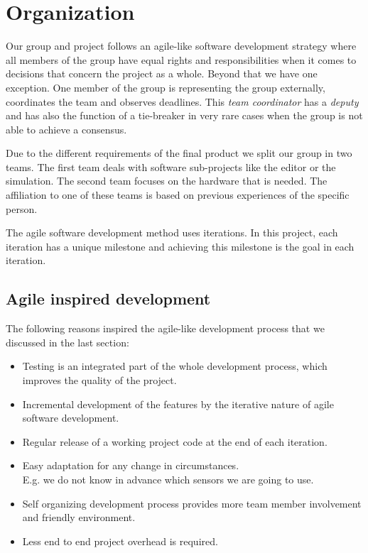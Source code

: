 \chapter{Organization}
Our group and project follows an agile-like software development strategy where all members of the group have equal rights and
responsibilities when it comes to decisions that concern the project as a whole.
Beyond that we have one exception. One member of the group is representing the group externally, coordinates the team and observes deadlines.
This \emph{team coordinator} has a \emph{deputy} and has also the function of a tie-breaker in very rare cases when the group is not able to achieve a consensus.

Due to the different requirements of the final product we split our group in two teams.
The first team deals with software sub-projects like the editor or the simulation.
The second team focuses on the hardware that is needed.
The affiliation to one of these teams is based on previous experiences of the specific person.

The agile software development method uses iterations.
In this project, each iteration has a unique milestone and achieving this milestone is the goal in each iteration.

\section{Agile inspired development}
The following reasons inspired the agile-like development process that we discussed in the last section:

\begin{itemize}
\item Testing is an integrated part of the whole development process, which improves the
quality of the project.
\item Incremental development of the features by the iterative nature of agile software
development.
\item Regular release of a working project code at the end of each iteration.
\item Easy adaptation for any change in circumstances.\\
	  E.g. we do not know in advance which sensors we are going to use.
\item Self organizing development process provides more team member involvement and
friendly environment.
\item Less end to end project overhead is required.
\end{itemize}

